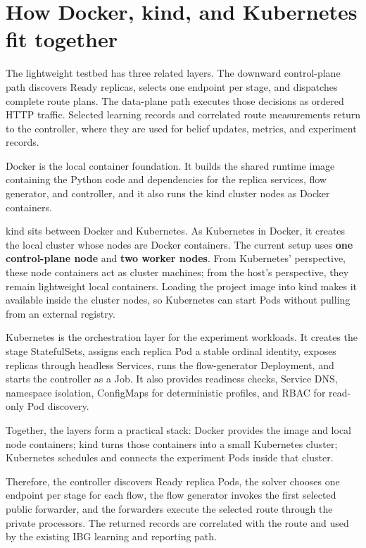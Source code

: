 \documentclass[12pt,a4paper]{article}
\begin{document}
\section{How Docker, kind, and Kubernetes fit together}
The lightweight testbed has three related layers. The downward control-plane path discovers Ready replicas, selects one endpoint per stage, and dispatches complete route plans. The data-plane path executes those decisions as ordered HTTP traffic. Selected learning records and correlated route measurements return to the controller, where they are used for belief updates, metrics, and experiment records.

Docker is the local container foundation. It builds the shared runtime image containing the Python code and dependencies for the replica services, flow generator, and controller, and it also runs the kind cluster nodes as Docker containers.

kind sits between Docker and Kubernetes. As Kubernetes in Docker, it creates the local cluster whose nodes are Docker containers. The current setup uses \textbf{one control-plane node} and \textbf{two worker nodes}. From Kubernetes' perspective, these node containers act as cluster machines; from the host's perspective, they remain lightweight local containers. Loading the project image into kind makes it available inside the cluster nodes, so Kubernetes can start Pods without pulling from an external registry.

Kubernetes is the orchestration layer for the experiment workloads. It creates the stage StatefulSets, assigns each replica Pod a stable ordinal identity, exposes replicas through headless Services, runs the flow-generator Deployment, and starts the controller as a Job. It also provides readiness checks, Service DNS, namespace isolation, ConfigMaps for deterministic profiles, and RBAC for read-only Pod discovery.

\begin{tcolorbox}[
  colback=white,
  colframe=red!75!black,
  boxrule=1.2pt,
  arc=3mm,
  left=4mm,
  right=4mm,
  top=3mm,
  bottom=3mm
]
Together, the layers form a practical stack: Docker provides the image and local node containers; kind turns those containers into a small Kubernetes cluster; Kubernetes schedules and connects the experiment Pods inside that cluster.
\vspace{0.6cm}

Therefore, the controller discovers Ready replica Pods, the solver chooses one endpoint per stage for each flow, the flow generator invokes the first selected public forwarder, and the forwarders execute the selected route through the private processors. The returned records are correlated with the route and used by the existing IBG learning and reporting path.
\end{tcolorbox}
\end{document}
